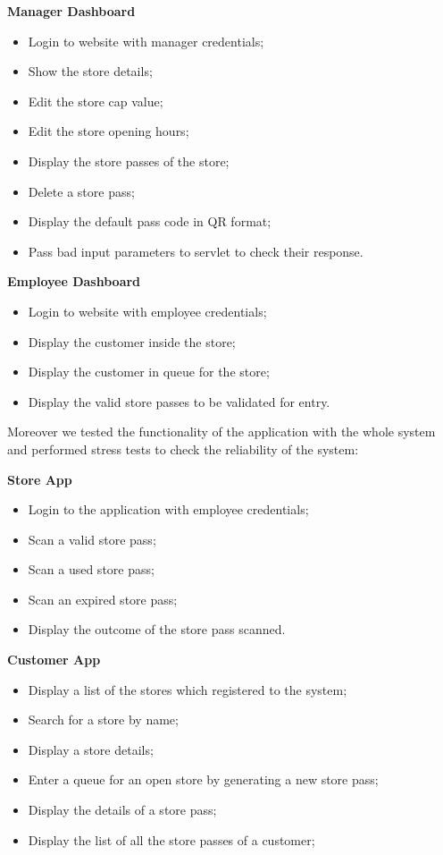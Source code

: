 \textbf{Manager Dashboard}
\begin{itemize}
	\item Login to website with manager credentials;
	\item Show the store details;
	\item Edit the store cap value;
	\item Edit the store opening hours;
	\item Display the store passes of the store;
	\item Delete a store pass;
	\item Display the default pass code in QR format;
	\item Pass bad input parameters to servlet to check their response.
\end{itemize}

\textbf{Employee Dashboard}
\begin{itemize}
	\item Login to website with employee credentials;
	\item Display the customer inside the store;
	\item Display the customer in queue for the store;
	\item Display the valid store passes to be validated for entry.
\end{itemize}
 
Moreover we tested the functionality of the application with the whole system and performed stress tests to check the reliability of the system:

\textbf{Store App}
\begin{itemize}
	\item Login to the application with employee credentials;
	\item Scan a valid store pass;
	\item Scan a used store pass;
	\item Scan an expired store pass;
	\item Display the outcome of the store pass scanned.
\end{itemize}

\textbf{Customer App}
\begin{itemize}
	\item Display a list of the stores which registered to the system;
	\item Search for a store by name;
	\item Display a store details;
	\item Enter a queue for an open store by generating a new store pass;
	\item Display the details of a store pass;
	\item Display the list of all the store passes of a customer;
\end{itemize}

